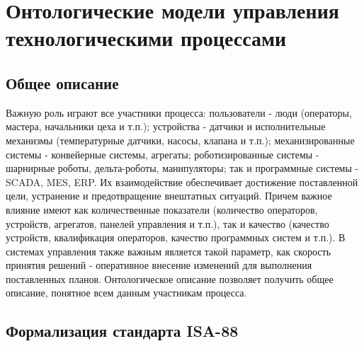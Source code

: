 \chapter{Онтологические модели управления технологическими процессами}

\section{Общее описание}

Важную роль играют все участники процесса: пользователи - люди (операторы, мастера, начальники цеха и т.п.); устройства - датчики и исполнительные механизмы (температурные датчики, насосы, клапана и т.п.); механизированные системы - конвейерные системы, агрегаты; роботизированные системы - шарнирные роботы, дельта-роботы, манипуляторы; так и программные системы - SCADA, MES, ERP. Их взаимодействие обеспечивает достижение поставленной цели, устранение и предотвращение внештатных ситуаций. Причем важное влияние имеют как количественные показатели (количество операторов, устройств, агрегатов, панелей управления и т.п.), так и качество (качество устройств, квалификация операторов, качество программных систем и т.п.). В системах управления также важным является такой параметр, как скорость принятия решений - оперативное внесение изменений для выполнения поставленных планов. Онтологическое описание позволяет получить общее описание, понятное всем данным участникам процесса.

\section{Формализация стандарта ISA-88}

